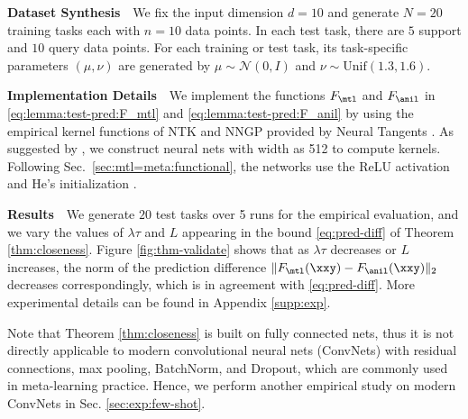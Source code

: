 \documentclass{article}
\begin{document}
\textbf{Dataset Synthesis}~~We fix the input dimension $d=10$ and generate $N=20$ training tasks each with $n=10$ data points. In each test task, there are $5$ support and $10$ query data points. For each training or test task, its task-specific parameters $(\mu,\nu)$ are generated by $\mu\sim \mathcal{N}(0,I)$ and $\nu\sim \mathrm{Unif}(1.3,1.6)$. 

\textbf{Implementation Details}~~We implement the functions $F_\mtl$ and $F_\anil$ in \eqref{eq:lemma:test-pred:F_mtl} and \eqref{eq:lemma:test-pred:F_anil} by using the empirical kernel functions of NTK and NNGP provided by Neural Tangents \cite{neuraltangents2020}. As suggested by \citet{neuraltangents2020}, we construct neural nets with width as 512 to compute kernels. Following Sec.~\ref{sec:mtl=meta:functional}, the networks use the ReLU activation and He's initialization \cite{resnet}.

\textbf{Results}~~We generate $20$ test tasks over 5 runs for the empirical evaluation, and we vary the values of $\lambda \tau$ and $L$ appearing in the bound \eqref{eq:pred-diff} of Theorem \ref{thm:closeness}. Figure \ref{fig:thm-validate} shows that as $\lambda \tau$ decreases or $L$ increases, the norm of the prediction difference $\|F_\mtl(\xxy) - F_\anil(\xxy)\|_2$ decreases correspondingly, which is in agreement with \eqref{eq:pred-diff}. More experimental details can be found in Appendix \ref{supp:exp}.

Note that Theorem \ref{thm:closeness} is built on fully connected nets, thus it is not directly applicable to modern convolutional neural nets (ConvNets) with residual connections, max pooling, BatchNorm, and Dropout, which are commonly used in meta-learning practice. Hence, we perform another empirical study on modern ConvNets in Sec. \ref{sec:exp:few-shot}.
\vspace{-.7em}
\end{document}
